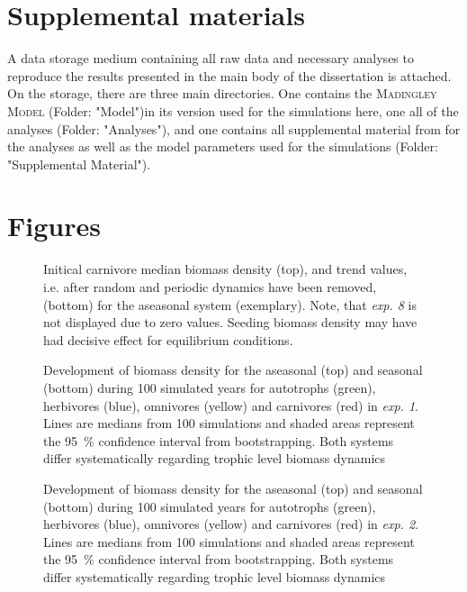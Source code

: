 \begin{appendices}
\chapter{Supplemental materials}
A data storage medium containing all raw data and necessary analyses to reproduce the results presented in the main body of the dissertation is attached. \\
On the storage, there are three main directories. One contains the \textsc{Madingley Model} (Folder: "Model")in its version used for the simulations here, one all of the analyses (Folder: "Analyses"), and one contains all supplemental material from \cite{Harfoot2014} for the analyses as well as the model parameters used for the simulations (Folder: "Supplemental Material").


\chapter{Figures}
\begin{figure}
\centering

\caption[Initial carnivore biomass density for the aseasonal system]{Initical carnivore median biomass density (top), and trend values, i.e. after random and periodic dynamics have been removed, (bottom) for the aseasonal system (exemplary). Note, that \textit{exp. 8} is not displayed due to zero values. Seeding biomass density may have had decisive effect for equilibrium conditions.}
\label{fig:app:tsinit}
\end{figure}
\begin{figure}[h!]
\centering

\caption[Log-body mass density time series for \textit{exp. 1} in both systems]{Development of biomass density for the aseasonal (top) and seasonal (bottom) during 100 simulated years for autotrophs (green), herbivores (blue), omnivores (yellow) and carnivores (red) in \textit{exp. 1}. Lines are medians from 100 simulations and shaded areas represent the 95~\% confidence interval from bootstrapping. Both systems differ systematically regarding trophic level biomass dynamics}
\label{fig:chap:res:ts:expno1}
\end{figure}

\clearpage

\begin{figure}[h!]
\centering

\caption[Log-body mass density time series for \textit{exp. 2} in both systems]{Development of biomass density for the aseasonal (top) and seasonal (bottom) during 100 simulated years for autotrophs (green), herbivores (blue), omnivores (yellow) and carnivores (red) in \textit{exp. 2}. Lines are medians from 100 simulations and shaded areas represent the 95~\% confidence interval from bootstrapping. Both systems differ systematically regarding trophic level biomass dynamics}
\label{fig:chap:res:ts:expno2}
\end{figure}


\end{appendices}
